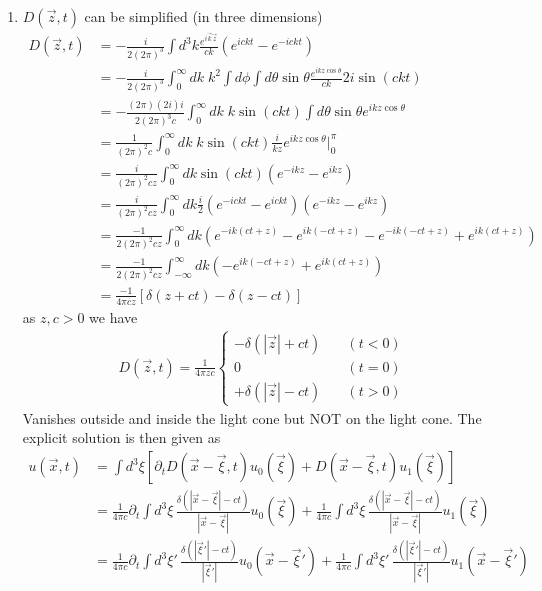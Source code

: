 \documentclass[../main.tex]{subfiles}
\begin{document}
\begin{itemize}
\begin{enumerate}
\item $D(\vec{z},t)$ can be simplified (in three dimensions)
\begin{align}
D(\vec{z},t)&=-\frac{i}{2(2\pi)^3}\int d^3k\frac{e^{i\vec{k}\vec{z}}}{ck}(e^{ickt}-e^{-ickt})\\
&=-\frac{i}{2(2\pi)^3}\int_0^\infty dk\;k^2\int d\phi\int d\theta\sin\theta\frac{e^{ikz\cos\theta}}{ck}2i\sin(ckt)\\
&=-\frac{(2\pi)(2i)i}{2(2\pi)^3c}\int_0^\infty dk\;k\sin(ckt)\int d\theta\sin\theta e^{ikz\cos\theta}\\
&=\frac{1}{(2\pi)^2c}\int_0^\infty dk\;k\sin(ckt)\frac{i}{kz}e^{ikz\cos\theta}|_0^\pi\\
&=\frac{i}{(2\pi)^2cz}\int_0^\infty dk\sin(ckt)\left(e^{-ikz}-e^{ikz}\right)\\
&=\frac{i}{(2\pi)^2cz}\int_0^\infty dk\frac{i}{2}(e^{-ickt}-e^{ickt})\left(e^{-ikz}-e^{ikz}\right)\\
&=\frac{-1}{2(2\pi)^2cz}\int_0^\infty dk(e^{-ik(ct+z)}-e^{ik(-ct+z)}-e^{-ik(-ct+z)}+e^{ik(ct+z)})\\
&=\frac{-1}{2(2\pi)^2cz}\int_{-\infty}^\infty dk(-e^{ik(-ct+z)}+e^{ik(ct+z)})\\
&=\frac{-1}{4\pi cz}\left[\delta(z+ct)-\delta(z-ct)\right]
\end{align}
as $z,c>0$ we have
\begin{align}
D(\vec{z},t)=\frac{1}{4\pi z c}\left\{\begin{matrix}
-\delta(|\vec{z}|+ct)&\quad(t<0) \\  
0&\quad(t=0)\\
+\delta(|\vec{z}|-ct) &\quad(t>0)
\end{matrix}
\right.
\end{align}
Vanishes outside and inside the light cone but NOT on the light cone. The explicit solution is then given as 
\begin{align}
u(\vec{x},t)
&=\int d^3\xi\left[ \partial_t D(\vec{x}-\vec{\xi},t)u_0(\vec{\xi})+D(\vec{x}-\vec{\xi},t)u_1(\vec{\xi})\right]\\
&=\frac{1}{4\pi c}\partial_t\int d^3\xi\,\frac{\delta(|\vec{x}-\vec{\xi}|-ct)}{|\vec{x}-\vec{\xi}|}u_0(\vec{\xi})+\frac{1}{4\pi c}\int d^3\xi\,\frac{\delta(|\vec{x}-\vec{\xi}|-ct)}{|\vec{x}-\vec{\xi}|}u_1(\vec{\xi})\\
&=\frac{1}{4\pi c}\partial_t\int d^3\xi'\,\frac{\delta(|\vec{\xi}'|-ct)}{|\vec{\xi}'|}u_0(\vec{x}-\vec{\xi}')+\frac{1}{4\pi c}\int d^3\xi'\,\frac{\delta(|\vec{\xi}'|-ct)}{|\vec{\xi}'|}u_1(\vec{x}-\vec{\xi}')\\

\end{align}
\end{enumerate}
\end{itemize}
\end{document}
